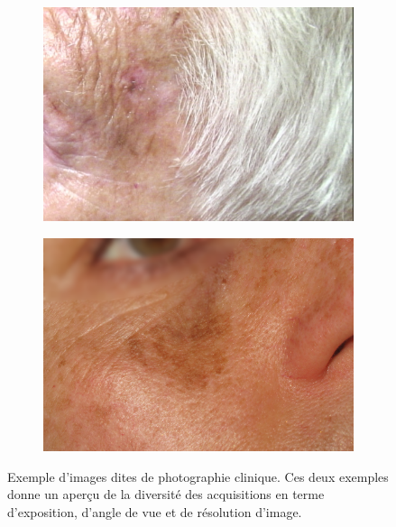 \begin{figure}[H]
\centering
    \begin{subfigure}{.45\textwidth}
      \centering
      \includegraphics[width=\linewidth]{contents/chapter_2/resources/example_photography_1.png}
    \end{subfigure}
    \begin{subfigure}{.45\textwidth}
      \centering
      \includegraphics[width=\linewidth]{contents/chapter_2/resources/example_photography_2.png}
    \end{subfigure}
    \caption{Exemple d'images dites de photographie clinique. Ces deux exemples donne un aperçu de la diversité des acquisitions en terme d'exposition, d'angle de vue et de résolution d'image.}
    \label{fig:example_photography}
\end{figure}\par

